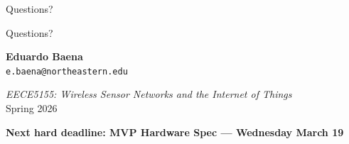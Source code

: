 \documentclass[aspectratio=169,11pt]{beamer}
\begin{document}
\begin{frame}{Questions?}
    \begin{center}
        \Huge Questions?

        \vspace{0.8cm}
        \normalsize
        \textbf{Eduardo Baena}\\
        \texttt{e.baena@northeastern.edu}

        \vspace{0.5cm}
        \textit{EECE5155: Wireless Sensor Networks and the Internet of Things}\\
        Spring 2026

        \vspace{0.5cm}
        \textbf{Next hard deadline: MVP Hardware Spec --- Wednesday March 19}
    \end{center}
\end{frame}
\end{document}
